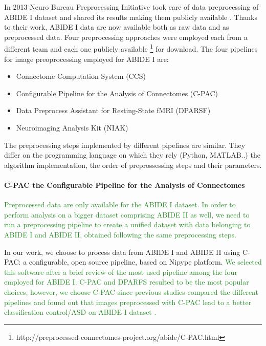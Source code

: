 \documentclass[11pt]{report}
\begin{document}
In 2013 Neuro Bureau Preprocessing Initiative took care of data preprocessing of ABIDE I dataset and shared its results making them publicly available \cite{cameron2013}.
Thanks to their work, ABIDE I data are now available both as raw data and as preprocessed data.
Four preprocessing approaches were employed each from a different team and each one publicly available \footnote{http://preprocessed-connectomes-project.org/abide/C-PAC.html} for download.
The four pipelines for image preoprocessing employed for ABIDE I are:
\begin{itemize}
\item Connectome Computation System (CCS)
\item Configurable Pipeline for the Analysis of Connectomes (C-PAC)
\item Data Preprocess Assistant for Resting-State fMRI (DPARSF)
\item Neuroimaging Analysis Kit (NIAK)
\end{itemize}
The preprocessing steps implemented by different pipelines are similar. They differ on the programming language on which they rely (Python, MATLAB..) the algorithm implementation, the order of preprossessing steps and their parameters.


\paragraph{C-PAC the Configurable Pipeline for the Analysis of Connectomes}\hfill

\textcolor{ForestGreen}{Preprocessed data are only available for the ABIDE I dataset.
In order to perform analysis on a bigger dataset comprising ABIDE II as well, we need to run a preprocessing pipeline to create a unified dataset with data belonging to ABIDE I and ABIDE II, obtained following the same preprocessing steps.}

In our work, we choose to process data from ABIDE I and ABIDE II using C-PAC: a configurable, open source pipeline, based on Nipype platform.
\textcolor{ForestGreen}{We selected this software after a brief review of the most used pipeline among the four employed for ABIDE I. C-PAC and DPARFS resulted to be the most popular choices, however, we choose C-PAC since previous studies compared the different pipelines and found out that images preprocessed with C-PAC lead to a better classification control/ASD on ABIDE I dataset \cite{yang2020}.}
\end{document}
